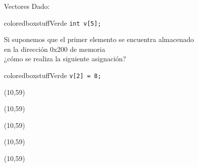 \documentclass[aspectratio=169]{beamer}
\begin{document}
\begin{frame}[fragile,t]{Vectores}
    Dado:\\
    \vskip 5pt
    \begin{beamercolorbox}[wd=0.9\textwidth,sep=0.5em]{coloredboxstuffVerde}
    \verb|int v[5];|\\
    \end{beamercolorbox}
    \pause
    Si suponemos que el primer elemento se encuentra almacenado\\  en la dirección 0x200 de memoria\\
    \vskip 5pt
    ¿cómo se realiza la siguiente asignación?
    \pause
    \vskip 5pt
    \begin{beamercolorbox}[wd=0.9\textwidth,sep=0.5em]{coloredboxstuffVerde}
    \verb|v[2] = 8;|
    \pause
    \end{beamercolorbox}
    \begin{textblock}{50}(10,59)  \end{textblock}
    \begin{textblock}{50}(10,59)  \end{textblock}
    \begin{textblock}{50}(10,59)  \end{textblock}
    \begin{textblock}{50}(10,59)  \end{textblock}
    \begin{textblock}{50}(10,59)  \end{textblock}
\end{frame}
\end{document}
